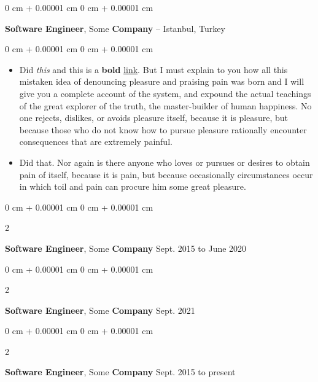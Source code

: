 \documentclass[10pt, letterpaper]{article}
\newenvironment{highlights}{
    \begin{itemize}[
        topsep=0.10 cm,
        parsep=0.10 cm,
        partopsep=0pt,
        itemsep=0pt,
        leftmargin=0 cm + 10pt
    ]
}{
    \end{itemize}
} %
\newenvironment{onecolentry}{
    \begin{adjustwidth}{
        0 cm + 0.00001 cm
    }{
        0 cm + 0.00001 cm
    }
}{
    \end{adjustwidth}
} %
\newenvironment{twocolentry}[2][]{
    \onecolentry
    \def\secondColumn{#2}
    \setcolumnwidth{\fill, 4.5 cm}
    \begin{paracol}{2}
}{
    \switchcolumn \raggedleft \secondColumn
    \end{paracol}
    \endonecolentry
} %
\begin{document}
        \begin{onecolentry}
            \textbf{Software Engineer}, Some \textbf{Company} -- Istanbul, Turkey\end{onecolentry}

        \vspace{0.10 cm}
        \begin{onecolentry}
            \begin{highlights}
                \item Did \textit{this} and this is a \textbf{bold} \href{https://example.com}{link}. But I must explain to you how all this mistaken idea of denouncing pleasure and praising pain was born and I will give you a complete account of the system, and expound the actual teachings of the great explorer of the truth, the master-builder of human happiness. No one rejects, dislikes, or avoids pleasure itself, because it is pleasure, but because those who do not know how to pursue pleasure rationally encounter consequences that are extremely painful.
                \item Did that. Nor again is there anyone who loves or pursues or desires to obtain pain of itself, because it is pain, but because occasionally circumstances occur in which toil and pain can procure him some great pleasure.
            \end{highlights}
        \end{onecolentry}


        \vspace{0.2 cm}

        \begin{twocolentry}{
            Sept. 2015 to June 2020
        }
            \textbf{Software Engineer}, Some \textbf{Company}\end{twocolentry}



        \vspace{0.2 cm}

        \begin{twocolentry}{
            Sept. 2021
        }
            \textbf{Software Engineer}, Some \textbf{Company}\end{twocolentry}



        \vspace{0.2 cm}

        \begin{twocolentry}{
            Sept. 2015 to present
        }
            \textbf{Software Engineer}, Some \textbf{Company}\end{twocolentry}
\end{document}
